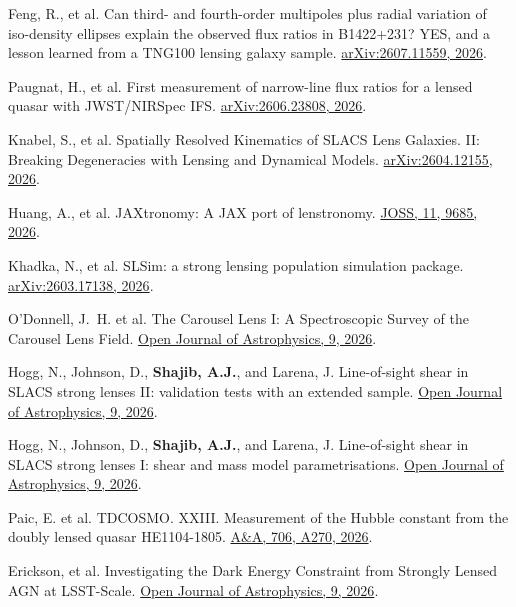 \documentclass[margin, line]{res}
\begin{document}
\begin{resume}
\begin{etaremune}
	\item Feng, R., et al. Can third- and fourth-order multipoles plus radial variation of iso-density ellipses explain the observed flux ratios in B1422+231? YES, and a lesson learned from a TNG100 lensing galaxy sample. \href{https://ui.adsabs.harvard.edu/abs/2026arXiv260711559F/abstract}{arXiv:2607.11559, 2026}.
	\item Paugnat, H., et al. First measurement of narrow-line flux ratios for a lensed quasar with JWST/NIRSpec IFS. \href{https://ui.adsabs.harvard.edu/abs/2026arXiv260623808P/abstract}{arXiv:2606.23808, 2026}.
	\item Knabel, S., et al. Spatially Resolved Kinematics of SLACS Lens Galaxies. II: Breaking Degeneracies with Lensing and Dynamical Models. \href{https://ui.adsabs.harvard.edu/abs/2026arXiv260412155K/abstract}{arXiv:2604.12155, 2026}.
	\item Huang, A., et al. JAXtronomy: A JAX port of lenstronomy. \href{https://ui.adsabs.harvard.edu/abs/2026JOSS...11.9685H/abstract}{JOSS, 11, 9685, 2026}.
	\item Khadka, N., et al. SLSim: a strong lensing population simulation package. \href{https://ui.adsabs.harvard.edu/abs/2026arXiv260317138K/abstract}{arXiv:2603.17138, 2026}.
	\item O'Donnell, J.~H. et al. The Carousel Lens I: A Spectroscopic Survey of the Carousel Lens Field. \href{https://ui.adsabs.harvard.edu/abs/2026OJAp....970181O/abstract}{Open Journal of Astrophysics, 9, 2026}.
	\item Hogg, N., Johnson, D., \textbf{Shajib, A.J.}, and Larena, J. Line-of-sight shear in SLACS strong lenses II: validation tests with an extended sample. \href{https://ui.adsabs.harvard.edu/abs/2026OJAp....965032H/abstract}{Open Journal of Astrophysics, 9, 2026}.
	\item Hogg, N., Johnson, D., \textbf{Shajib, A.J.}, and Larena, J. Line-of-sight shear in SLACS strong lenses I: shear and mass model parametrisations. \href{https://ui.adsabs.harvard.edu/abs/2026OJAp....964832H/abstract}{Open Journal of Astrophysics, 9, 2026}.
	\item Paic, E. et al. TDCOSMO. XXIII. Measurement of the Hubble constant from the doubly lensed quasar HE1104-1805. \href{https://ui.adsabs.harvard.edu/abs/2026A\%26A...706A.270P/abstract}{A\&A, 706, A270, 2026}.
	\item Erickson, et al. Investigating the Dark Energy Constraint from Strongly Lensed AGN at LSST-Scale. \href{https://ui.adsabs.harvard.edu/abs/2026OJAp....964440E/abstract}{Open Journal of Astrophysics, 9, 2026}.

\end{etaremune}
\end{resume}
\end{document}
